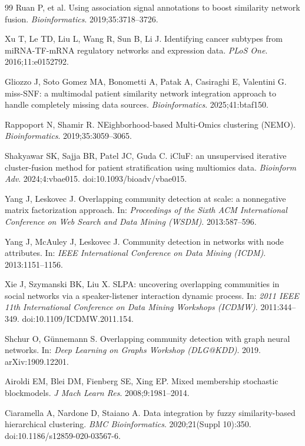 \documentclass[11pt,a4paper]{article}
\begin{document}
\begin{thebibliography}{99}
Ruan P, et al. Using association signal annotations to boost similarity network fusion. \textit{Bioinformatics}. 2019;35:3718--3726.

Xu T, Le TD, Liu L, Wang R, Sun B, Li J. Identifying cancer subtypes from miRNA-TF-mRNA regulatory networks and expression data. \textit{PLoS One}. 2016;11:e0152792.

Gliozzo J, Soto Gomez MA, Bonometti A, Patak A, Casiraghi E, Valentini G. miss-SNF: a multimodal patient similarity network integration approach to handle completely missing data sources. \textit{Bioinformatics}. 2025;41:btaf150.

Rappoport N, Shamir R. NEighborhood-based Multi-Omics clustering (NEMO). \textit{Bioinformatics}. 2019;35:3059--3065.

Shakyawar SK, Sajja BR, Patel JC, Guda C. iCluF: an unsupervised iterative cluster-fusion method for patient stratification using multiomics data. \textit{Bioinform Adv}. 2024;4:vbae015. doi:10.1093/bioadv/vbae015.

Yang J, Leskovec J. Overlapping community detection at scale: a nonnegative matrix factorization approach. In: \textit{Proceedings of the Sixth ACM International Conference on Web Search and Data Mining (WSDM)}. 2013:587--596.

Yang J, McAuley J, Leskovec J. Community detection in networks with node attributes. In: \textit{IEEE International Conference on Data Mining (ICDM)}. 2013:1151--1156.

Xie J, Szymanski BK, Liu X. SLPA: uncovering overlapping communities in social networks via a speaker-listener interaction dynamic process. In: \textit{2011 IEEE 11th International Conference on Data Mining Workshops (ICDMW)}. 2011:344--349. doi:10.1109/ICDMW.2011.154.

Shchur O, G\"unnemann S. Overlapping community detection with graph neural networks. In: \textit{Deep Learning on Graphs Workshop (DLG@KDD)}. 2019. arXiv:1909.12201.

Airoldi EM, Blei DM, Fienberg SE, Xing EP. Mixed membership stochastic blockmodels. \textit{J Mach Learn Res}. 2008;9:1981--2014.

Ciaramella A, Nardone D, Staiano A. Data integration by fuzzy similarity-based hierarchical clustering. \textit{BMC Bioinformatics}. 2020;21(Suppl 10):350. doi:10.1186/s12859-020-03567-6.


\end{thebibliography}
\end{document}
